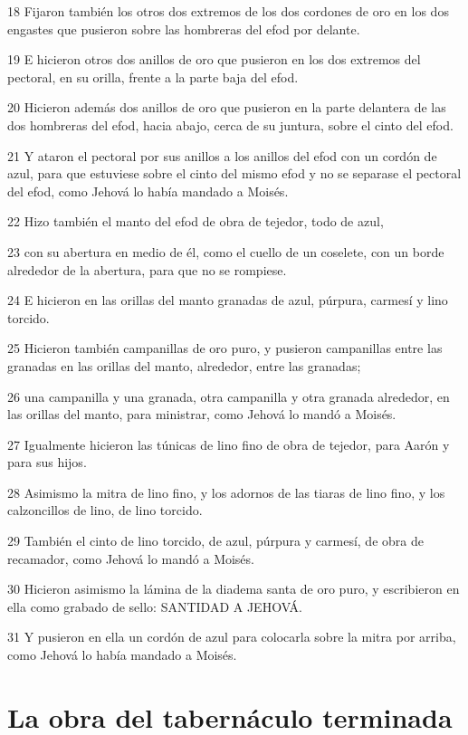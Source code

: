 \par 18 Fijaron también los otros dos extremos de los dos cordones de oro en los dos engastes que pusieron sobre las hombreras del efod por delante.
\par 19 E hicieron otros dos anillos de oro que pusieron en los dos extremos del pectoral, en su orilla, frente a la parte baja del efod.
\par 20 Hicieron además dos anillos de oro que pusieron en la parte delantera de las dos hombreras del efod, hacia abajo, cerca de su juntura, sobre el cinto del efod.
\par 21 Y ataron el pectoral por sus anillos a los anillos del efod con un cordón de azul, para que estuviese sobre el cinto del mismo efod y no se separase el pectoral del efod, como Jehová lo había mandado a Moisés.
\par 22 Hizo también el manto del efod de obra de tejedor, todo de azul,
\par 23 con su abertura en medio de él, como el cuello de un coselete, con un borde alrededor de la abertura, para que no se rompiese.
\par 24 E hicieron en las orillas del manto granadas de azul, púrpura, carmesí y lino torcido.
\par 25 Hicieron también campanillas de oro puro, y pusieron campanillas entre las granadas en las orillas del manto, alrededor, entre las granadas;
\par 26 una campanilla y una granada, otra campanilla y otra granada alrededor, en las orillas del manto, para ministrar, como Jehová lo mandó a Moisés.
\par 27 Igualmente hicieron las túnicas de lino fino de obra de tejedor, para Aarón y para sus hijos.
\par 28 Asimismo la mitra de lino fino, y los adornos de las tiaras de lino fino, y los calzoncillos de lino, de lino torcido.
\par 29 También el cinto de lino torcido, de azul, púrpura y carmesí, de obra de recamador, como Jehová lo mandó a Moisés.
\par 30 Hicieron asimismo la lámina de la diadema santa de oro puro, y escribieron en ella como grabado de sello: SANTIDAD A JEHOVÁ.
\par 31 Y pusieron en ella un cordón de azul para colocarla sobre la mitra por arriba, como Jehová lo había mandado a Moisés.

\section*{La obra del tabernáculo terminada}


